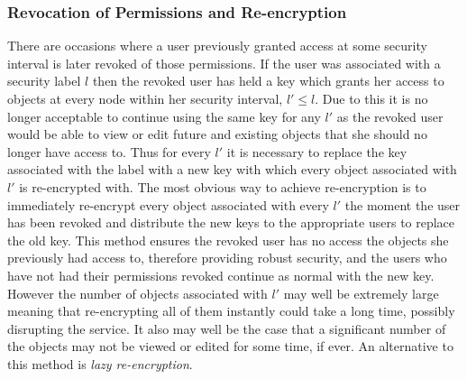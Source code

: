 \documentclass[12pt, titlepage]{article}
\begin{document}
\subsubsection{Revocation of Permissions and Re-encryption}
There are occasions where a user previously granted access at some security interval is later revoked of those permissions. If the user was associated with a security label $l$ then the revoked user has held a key which grants her access to objects at every node within her security interval, $l' \le l$. Due to this it is no longer acceptable to continue using the same key for any $l'$ as the revoked user would be able to view or edit future and existing objects that she should no longer have access to. Thus for every $l'$ it is necessary to replace the key associated with the label with a new key with which every object associated with $l'$ is re-encrypted with.
\newline \indent The most obvious way to achieve re-encryption is to immediately re-encrypt every object associated with every $l'$ the moment the user has been revoked and distribute the new keys to the appropriate users to replace the old key. This method ensures the revoked user has no access the objects she previously had access to, therefore providing robust security, and the users who have not had their permissions revoked continue as normal with the new key. However the number of objects associated with $l'$ may well be extremely large meaning that re-encrypting all of them instantly could take a long time, possibly disrupting the service. It also may well be the case that a significant number of the objects may not be viewed or edited for some time, if ever. An alternative to this method is \textit{lazy re-encryption}.
\end{document}
